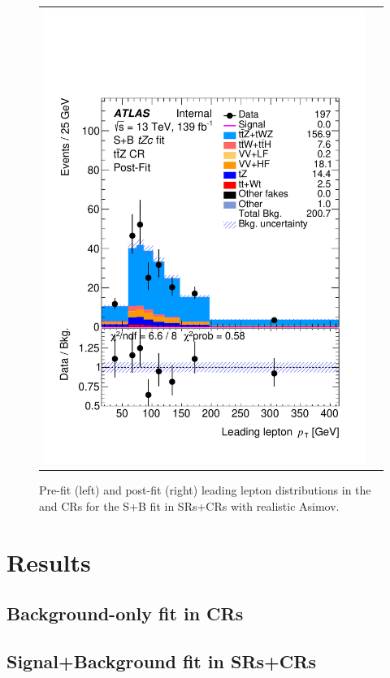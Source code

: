 \begin{figure}[htbp]
\begin{tabular}{cc}
		\includegraphics[width=.45\textwidth]{Chapters/CH8/figures/SPLUSB_CRSR_UsingDL1rcFullSys/Plots/TTZCR_postFit} \\
	\end{tabular}
	\caption{Pre-fit (left) and post-fit (right) leading lepton \pt distributions in the \ttbar and \ttZ CRs for the S+B \tZc fit in SRs+CRs with realistic Asimov.
		\ErrStatSys
	}%
	\label{fig:stat:tzc:splusb:crsr:crplots:2}
\end{figure}




\clearpage
\section{Results}
\label{sec:stat:tzc}
\clearpage
\subsection{Background-only fit in CRs}
\clearpage
\subsection{Signal+Background fit in SRs+CRs}
\clearpage

